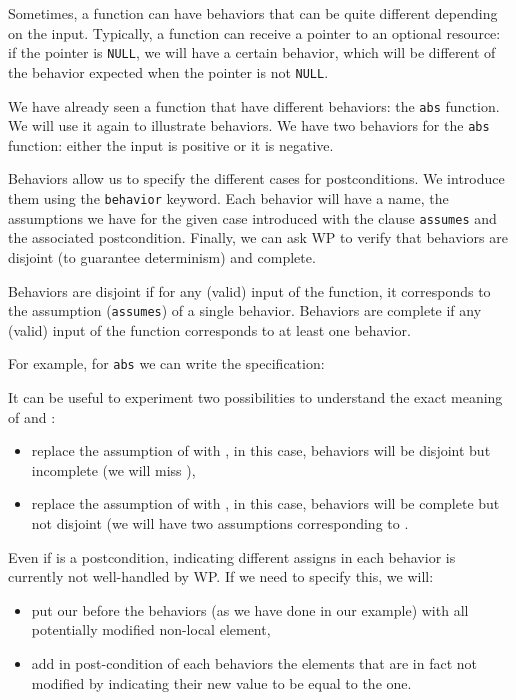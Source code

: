 Sometimes, a function can have behaviors that can be quite different
depending on the input. Typically, a function can receive a pointer to
an optional resource: if the pointer is \texttt{NULL}, we will have a
certain behavior, which will be different of the behavior expected when
the pointer is not \texttt{NULL}.

We have already seen a function that have different behaviors: the
\texttt{abs} function. We will use it again to illustrate behaviors. We
have two behaviors for the \texttt{abs} function: either the input is
positive or it is negative.

Behaviors allow us to specify the different cases for postconditions. We
introduce them using the \texttt{behavior} keyword. Each behavior will
have a name, the assumptions we have for the given case introduced with
the clause \texttt{assumes} and the associated postcondition. Finally,
we can ask WP to verify that behaviors are disjoint (to guarantee
determinism) and complete.

Behaviors are disjoint if for any (valid) input of the function, it
corresponds to the assumption (\texttt{assumes}) of a single behavior.
Behaviors are complete if any (valid) input of the function corresponds
to at least one behavior.

For example, for \texttt{abs} we can write the specification:






It can be useful to experiment two possibilities to understand the exact
meaning of  and :

\begin{itemize}
\item
  replace the assumption of  with
  , in this case, behaviors will be
  disjoint but incomplete (we will miss ),
\item
  replace the assumption of  with
  , in this case, behaviors will be
  complete but not disjoint (we will have two assumptions corresponding
  to .
\end{itemize}


\begin{Warning}
  Even if  is a postcondition, indicating different assigns
  in each behavior is currently not well-handled by WP. If we need to specify
  this, we will:
  \begin{itemize}
  \item put our  before the behaviors (as we have done in our
    example) with all potentially modified non-local element,
  \item add in post-condition of each behaviors the elements that are in fact
    not modified by indicating their new value to be equal to the
     one.
  \end{itemize}
\end{Warning}


